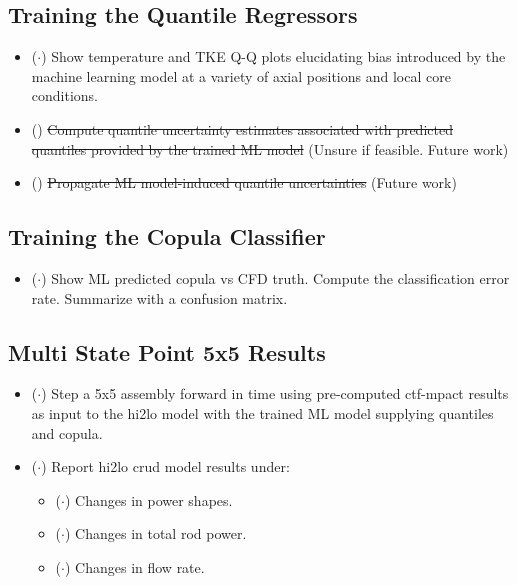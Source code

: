 \subsection{Training the Quantile Regressors}

\begin{itemize}
    \item ($\cdot$) Show temperature and TKE Q-Q plots elucidating bias introduced by the machine learning model at a variety of axial positions and local core conditions.
    \item (\xmark) \sout{Compute quantile uncertainty estimates associated with predicted quantiles provided by the trained ML model} (Unsure if feasible. Future work)
    \item (\xmark) \sout{Propagate ML model-induced quantile uncertainties} (Future work)
\end{itemize}

\subsection{Training the Copula Classifier}

\begin{itemize}
    \item ($\cdot$)  Show ML predicted copula vs CFD truth.  Compute the classification error rate.
        Summarize with a confusion matrix.
\end{itemize}

\subsection{Multi State Point 5x5 Results}

\begin{itemize}
    \item ($\cdot$) Step a 5x5 assembly forward in time using pre-computed ctf-mpact results as input to the hi2lo model with the trained ML model supplying quantiles and copula.
    \item ($\cdot$) Report hi2lo crud model results under:
    \begin{itemize}
        \item ($\cdot$) Changes in power shapes.
        \item ($\cdot$) Changes in total rod power.
        \item ($\cdot$) Changes in flow rate.
    \end{itemize}

\end{itemize}
